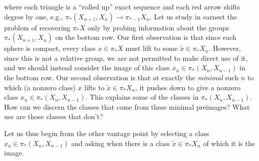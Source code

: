 \begin{figure*}[h]
\begin{center}
\end{center}
\end{figure*}

\noindent
where each triangle is a ``rolled up'' exact sequence and each red arrow shifts degree by one, e.g., $\pi_*(X_{n+1}, X_n) \to \pi_{*-1} X_n$.
Let us study in earnest the problem of recovering $\pi_* X$ only by probing information about the groups $\pi_*(X_{n+1}, X_n)$ on the bottom row.
Our first observation is that since each sphere is compact, every class $x \in \pi_* X$ must lift to some $\widetilde x \in \pi_* X_n$.
However, since this is not a relative group, we are not permitted to make direct use of it, and we should instead consider the image of this class $x_n \in \pi_*(X_n, X_{n-1})$ in the bottom row.
Our second observation is that at exactly the \emph{minimal} such $n$ to which (a nonzero class) $x$ lifts to $\widetilde x \in \pi_* X_n$, it pushes down to give a nonzero class $x_n \in \pi_*(X_n, X_{n-1})$.
This explains some of the classes in $\pi_*(X_n, X_{n-1})$.
How can we discern the classes that come from these minimal preimages?
What use are those classes that don't?

Let us thus begin from the other vantage point by selecting a class $x_n \in \pi_*(X_n, X_{n-1})$ and asking when there is a class $\widetilde x \in \pi_* X_n$ of which it is the image.

\begin{center}
\end{center}


